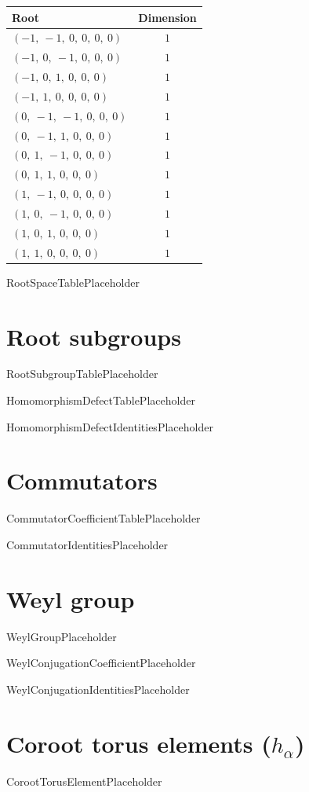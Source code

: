 \documentclass[11pt]{article}
\theoremstyle{definition}
\begin{document}
\begin{center}
\begin{tabular}{|l|c|}
\hline
Root & Dimension \\
\hline
$\left( -1, \  -1, \  0, \  0, \  0, \  0\right)$ & $1$ \\
\hline
$\left( -1, \  0, \  -1, \  0, \  0, \  0\right)$ & $1$ \\
\hline
$\left( -1, \  0, \  1, \  0, \  0, \  0\right)$ & $1$ \\
\hline
$\left( -1, \  1, \  0, \  0, \  0, \  0\right)$ & $1$ \\
\hline
$\left( 0, \  -1, \  -1, \  0, \  0, \  0\right)$ & $1$ \\
\hline
$\left( 0, \  -1, \  1, \  0, \  0, \  0\right)$ & $1$ \\
\hline
$\left( 0, \  1, \  -1, \  0, \  0, \  0\right)$ & $1$ \\
\hline
$\left( 0, \  1, \  1, \  0, \  0, \  0\right)$ & $1$ \\
\hline
$\left( 1, \  -1, \  0, \  0, \  0, \  0\right)$ & $1$ \\
\hline
$\left( 1, \  0, \  -1, \  0, \  0, \  0\right)$ & $1$ \\
\hline
$\left( 1, \  0, \  1, \  0, \  0, \  0\right)$ & $1$ \\
\hline
$\left( 1, \  1, \  0, \  0, \  0, \  0\right)$ & $1$ \\
\hline
\end{tabular}\end{center}

RootSpaceTablePlaceholder

\section{Root subgroups}

RootSubgroupTablePlaceholder

HomomorphismDefectTablePlaceholder

HomomorphismDefectIdentitiesPlaceholder

\section{Commutators}

CommutatorCoefficientTablePlaceholder

CommutatorIdentitiesPlaceholder

\section{Weyl group}

WeylGroupPlaceholder

WeylConjugationCoefficientPlaceholder

WeylConjugationIdentitiesPlaceholder

\section{Coroot torus elements ($h_\alpha$)}

CorootTorusElementPlaceholder
\end{document}
